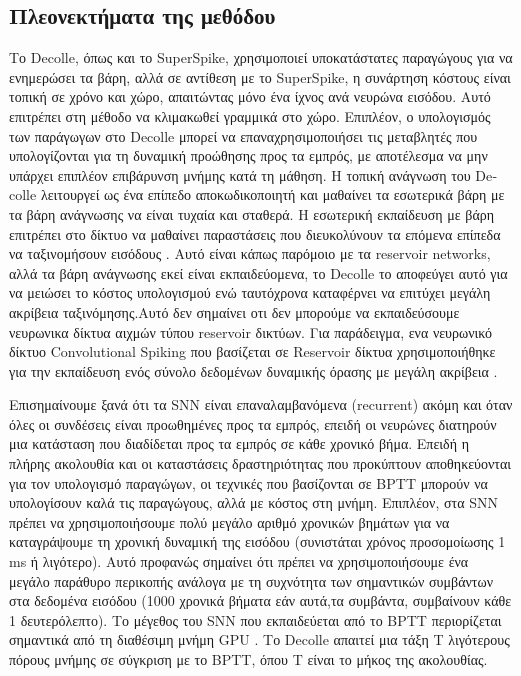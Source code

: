 \documentclass[12pt]{report}
\begin{document}
\subsection{Πλεονεκτήματα της μεθόδου}
Το \textlatin{Decolle}, όπως και το \textlatin{SuperSpike}, χρησιμοποιεί υποκατάστατες παραγώγους για να ενημερώσει τα βάρη, αλλά σε αντίθεση με το \textlatin{SuperSpike}, η συνάρτηση κόστους είναι τοπική σε χρόνο και χώρο, απαιτώντας μόνο ένα ίχνος ανά νευρώνα εισόδου. Αυτό επιτρέπει στη μέθοδο να κλιμακωθεί γραμμικά στο χώρο. Επιπλέον, ο υπολογισμός των παράγωγων στο \textlatin{Decolle} μπορεί να επαναχρησιμοποιήσει τις μεταβλητές που υπολογίζονται για τη δυναμική προώθησης προς τα εμπρός, με αποτέλεσμα να μην υπάρχει επιπλέον επιβάρυνση μνήμης κατά τη μάθηση. Η τοπική ανάγνωση του \textlatin{Decolle} λειτουργεί ως ένα επίπεδο αποκωδικοποιητή και μαθαίνει τα εσωτερικά βάρη με τα βάρη ανάγνωσης να είναι τυχαία και σταθερά. Η εσωτερική εκπαίδευση με βάρη επιτρέπει στο δίκτυο να μαθαίνει παραστάσεις που διευκολύνουν τα επόμενα επίπεδα να ταξινομήσουν εισόδους \cite{neftci2017}. Αυτό είναι κάπως παρόμοιο με τα \textlatin{reservoir networks}, αλλά τα βάρη ανάγνωσης εκεί είναι εκπαιδεύομενα, το \textlatin{Decolle} το αποφεύγει αυτό για να μειώσει το κόστος υπολογισμού ενώ ταυτόχρονα καταφέρνει να επιτύχει μεγάλη ακρίβεια ταξινόμησης.Αυτό δεν σημαίνει οτι δεν μπορούμε να εκπαιδεύσουμε νευρωνικα δίκτυα αιχμών τύπου \textlatin{reservoir} δικτύων. Για παράδειγμα, ενα νευρωνικό δίκτυο \textlatin{Convolutional Spiking} που βασίζεται σε \textlatin{Reservoir} δίκτυα χρησιμοποιήθηκε για την εκπαίδευση ενός σύνολο δεδομένων δυναμικής όρασης με μεγάλη ακρίβεια \cite{george2020}.

Επισημαίνουμε ξανά ότι τα \textlatin{SNN} είναι επαναλαμβανόμενα (\textlatin{recurrent}) ακόμη και όταν όλες οι συνδέσεις είναι προωθημένες προς τα εμπρός, επειδή οι νευρώνες διατηρούν μια κατάσταση που διαδίδεται προς τα εμπρός σε κάθε χρονικό βήμα. Επειδή η πλήρης ακολουθία και οι καταστάσεις δραστηριότητας που προκύπτουν αποθηκεύονται για τον υπολογισμό παραγώγων, οι τεχνικές που βασίζονται σε \textlatin{BPTT} μπορούν να υπολογίσουν καλά τις παραγώγους, αλλά με κόστος στη μνήμη. Επιπλέον, στα \textlatin{SNN} πρέπει να χρησιμοποιήσουμε πολύ μεγάλο αριθμό χρονικών βημάτων για να καταγράψουμε τη χρονική δυναμική της εισόδου (συνιστάται χρόνος προσομοίωσης 1 \textlatin{ms} ή λιγότερο). Αυτό προφανώς σημαίνει ότι πρέπει να χρησιμοποιήσουμε ένα μεγάλο παράθυρο περικοπής ανάλογα με τη συχνότητα των σημαντικών συμβάντων στα δεδομένα εισόδου (1000 χρονικά βήματα εάν αυτά,τα συμβάντα, συμβαίνουν κάθε 1 δευτερόλεπτο). Το μέγεθος του \textlatin{SNN} που εκπαιδεύεται από το \textlatin{BPTT} περιορίζεται σημαντικά από τη διαθέσιμη μνήμη \textlatin{GPU} \cite{ochard2018}. Το \textlatin{Decolle} απαιτεί μια τάξη \textlatin{T} λιγότερους πόρους μνήμης σε σύγκριση με το \textlatin{BPTT}, όπου \textlatin{T} είναι το μήκος της ακολουθίας.
\end{document}
